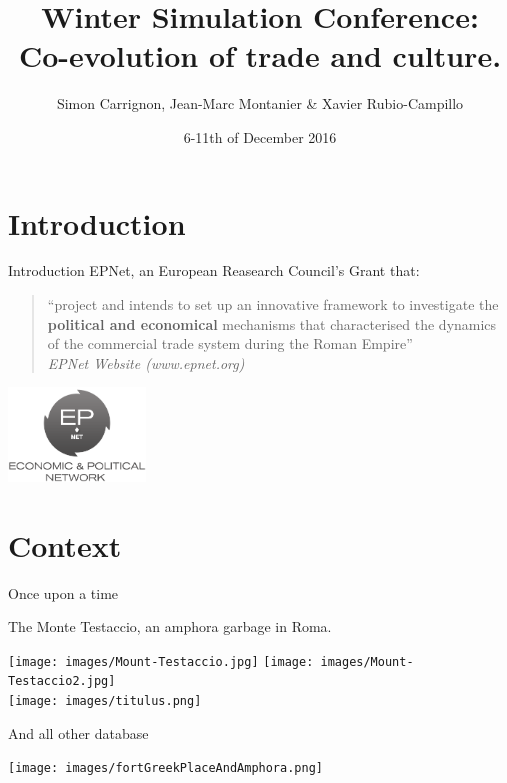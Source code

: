 \documentclass[12pt, handout=show,notes=show]{beamer}
\title{
	Winter Simulation Conference:\\
	Co-evolution of trade and culture.
}
\date{6-11th of December 2016}
\author{Simon Carrignon, Jean-Marc Montanier \& Xavier Rubio-Campillo}
\begin{document}
\begin{frame}
	\maketitle

\end{frame}

\section{Introduction}
\begin{frame}{Introduction}
    EPNet, an European Reasearch Council's Grant that:\\
    \begin{quote}
    \small
    ``project and intends to set up an innovative framework to investigate the \textbf{political and economical} mechanisms that characterised the dynamics of the commercial trade system during the Roman Empire''\\
	\emph{EPNet Website (www.epnet.org)}
    \end{quote}
    \begin{center}
    \end{center}
	\begin{center}
		\includegraphics[height=2.5cm]{images/epnetLogo.png}
	\end{center}
\end{frame}



\section{Context}

\begin{frame}{Once upon a time}

	The Monte Testaccio, an amphora garbage in Roma.\\

	\begin{center}
		\texttt{[image: images/Mount-Testaccio.jpg]}
		\hfil \texttt{[image: images/Mount-Testaccio2.jpg]}\\
		\vfill
		\texttt{[image: images/titulus.png]}

	\end{center}

\end{frame}
\begin{frame}{And all other database}
    
    \begin{center}
	\texttt{[image: images/fortGreekPlaceAndAmphora.png]}
    \end{center}
\end{frame}
\end{document}
